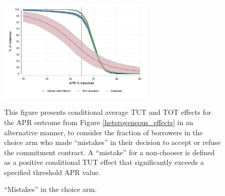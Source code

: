 \documentclass[12pt, a4paper]{article}
\begin{document}
\begin{figure}[H]
 \caption{``Mistakes'' in the choice arm.}
\begin{center}
        \centering
        \includegraphics[width=0.65\textwidth]{Figuras/line_cw_apr_tot_tut.pdf}
 \end{center}       
 \footnotesize{This figure presents conditional average TUT and TOT effects for the APR outcome from Figure \ref{heterogeneous_effects} in an alternative manner, to consider the fraction of borrowers in the choice arm who made ``mistakes'' in their decision to accept or refuse the commitment contract. A ``mistake'' for a non-chooser is defined as a positive conditional TUT effect that significantly exceeds a specified threshold APR value.
}
    \label{choose_wrong}
\end{figure}
\end{document}
